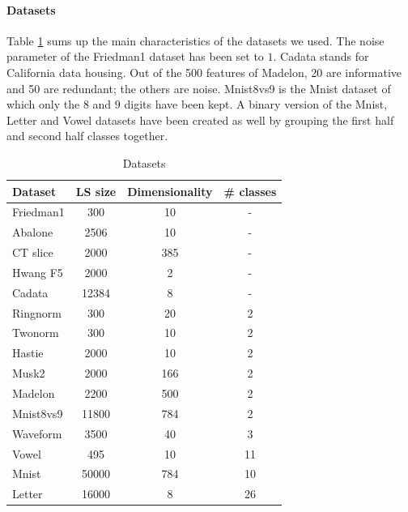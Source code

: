 \documentclass{article}
\begin{document}
\paragraph{Datasets}
Table \ref{tab:datasets} sums up the main characteristics of the datasets we 
used. The noise parameter of the Friedman1 dataset has been set to $1$. Cadata 
stands for California data housing. Out of the 500 features of Madelon, 20 are 
informative and 50 are redundant; the others are noise. Mnist8vs9 is the Mnist 
dataset of which only the $8$ and $9$ digits have been kept. A binary version 
of the Mnist, Letter and Vowel datasets have been created as well by grouping 
the first half and second half classes together.

\begin{table}[t]
\caption{Datasets}
\label{tab:datasets}
\vskip 0.15in
\begin{center}
\begin{small}
\begin{sc}
\begin{tabular}{l|ccc}
\hline
Dataset & LS size & Dimensionality & \# classes\\
\hline
Friedman1 & 300 & 10 & - \\
Abalone & 2506 & 10 & - \\
CT slice & 2000 & 385 & - \\
Hwang F5 & 2000 & 2 & - \\
Cadata & 12384 & 8 & - \\
Ringnorm & 300 & 20 & 2 \\
Twonorm & 300 & 10 & 2 \\
Hastie & 2000 & 10 & 2 \\
Musk2 & 2000 & 166 & 2 \\
Madelon & 2200 & 500 & 2 \\
Mnist8vs9 & 11800 & 784 & 2 \\
Waveform & 3500 & 40 & 3 \\
Vowel & 495 & 10 & 11 \\
Mnist & 50000 & 784 & 10 \\
Letter & 16000 & 8 & 26 \\
\hline
\end{tabular}
\end{sc}
\end{small}
\end{center}
\vskip -0.1in
\end{table}
\end{document}
